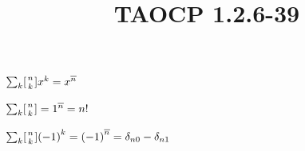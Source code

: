 \documentclass{article}
\title{TAOCP 1.2.6\mbox{-}39}
\begin{document}
\maketitle

\( \sum_{k} [{n \atop k}]x^{k} = x^{\overline{n}} \)

\( \sum_{k} [{n \atop k}] = 1^{\overline{n}} = n! \)

\( \sum_{k} [{n \atop k}]{(-1)}^{k} = {(-1)}^{\overline{n}} = \delta_{n0} - \delta_{n1} \)
\end{document}
